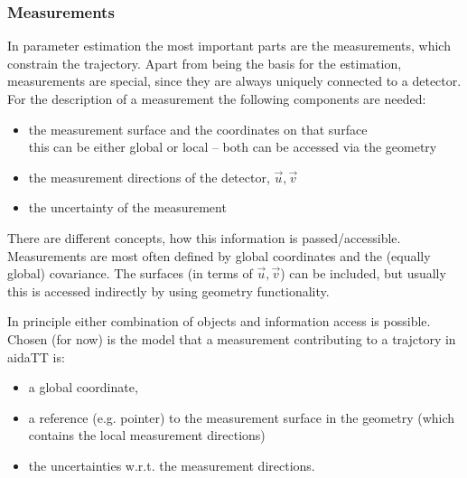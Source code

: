 \documentclass[12pt]{article}
\begin{document}
\subsubsection*{Measurements}
In parameter estimation the most important parts are the measurements, which constrain the trajectory.
Apart from being the basis for the estimation, measurements are special, since they are always uniquely connected to a detector.
For the description of a measurement the following components are needed:
\begin{itemize}
	\item the measurement surface and the coordinates on that surface\\
		this can be either global or local -- both can be accessed via the geometry
	\item the measurement directions of the detector, $\vec{u},\vec{v}$
	\item the uncertainty of the measurement
\end{itemize}
There are different concepts, how this information is passed/accessible.
Measurements are most often defined by global coordinates and the (equally global) covariance.
The surfaces (in terms of  $\vec{u},\vec{v}$) can be included, but usually this is accessed indirectly by using geometry functionality.

In principle either combination of objects and information access is possible.
Chosen (for now) is the model that a measurement contributing to a trajctory in aidaTT is:
\begin{itemize}
	\item a global coordinate,
	\item a reference (e.g. pointer) to the measurement surface in the geometry (which contains the local measurement directions)
	\item the uncertainties w.r.t. the measurement directions.
\end{itemize}
	
\end{document}
